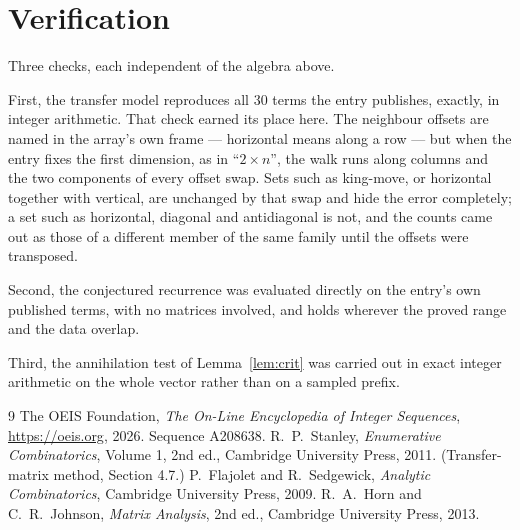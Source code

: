 \documentclass[11pt,a4paper]{article}
\theoremstyle{plain}
\theoremstyle{definition}
\begin{document}
\section{Verification}

Three checks, each independent of the algebra above.

First, the transfer model reproduces all $30$ terms the entry publishes, exactly, in
integer arithmetic. That check earned its place here. The neighbour offsets are named in the
array's own frame --- horizontal means along a row --- but when the entry fixes the first
dimension, as in ``$2\times n$'', the walk runs along columns and the two components of every
offset swap. Sets such as king-move, or horizontal together with vertical, are unchanged by
that swap and hide the error completely; a set such as horizontal, diagonal and antidiagonal
is not, and the counts came out as those of a different member of the same family until the
offsets were transposed.

Second, the conjectured recurrence was evaluated directly on the entry's own published terms,
with no matrices involved, and holds wherever the proved range and the data overlap.

Third, the annihilation test of Lemma~\ref{lem:crit} was carried out in exact integer
arithmetic on the whole vector rather than on a sampled prefix.

\begin{thebibliography}{9}
 The OEIS Foundation, \emph{The On-Line Encyclopedia of Integer
Sequences}, \url{https://oeis.org}, 2026. Sequence A208638.
 R.~P.~Stanley, \emph{Enumerative Combinatorics}, Volume 1, 2nd ed.,
Cambridge University Press, 2011. (Transfer-matrix method, Section 4.7.)
 P.~Flajolet and R.~Sedgewick, \emph{Analytic Combinatorics}, Cambridge
University Press, 2009.
 R.~A.~Horn and C.~R.~Johnson, \emph{Matrix Analysis}, 2nd ed., Cambridge
University Press, 2013.
\end{thebibliography}
\end{document}
